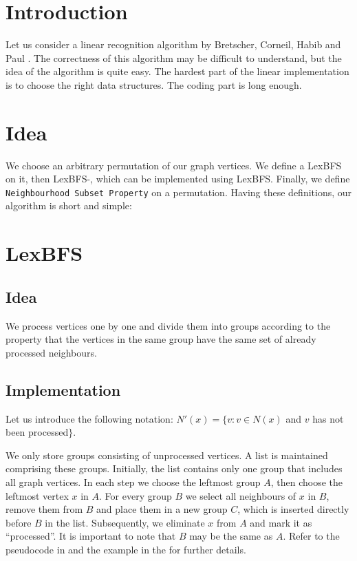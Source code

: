 \section{Introduction}
Let us consider a linear recognition algorithm by Bretscher, Corneil, Habib and
Paul \cite{Bretscher2003ASL}.
The correctness of this algorithm may be difficult to understand, but the idea of the algorithm is quite easy. The hardest part of the linear implementation is to choose the right data structures. The coding part is long enough.
\section{Idea}
We choose an arbitrary permutation of our graph vertices. We define a LexBFS on it, then LexBFS-, which can be implemented using LexBFS. Finally, we define \texttt{Neighbourhood Subset Property} on a permutation. Having these definitions, our algorithm is short and simple:

\section{LexBFS}
\subsection{Idea}
We process vertices one by one and divide them into groups according to the property that the vertices in the same group have the same set of already processed neighbours. 
\subsection{Implementation}
Let us introduce the following notation: $N'(x) = \{v \colon v \in N(x)$ and $v$ has not been processed$\}$.

We only store groups consisting of unprocessed vertices. A list is maintained comprising these groups. Initially, the list contains only one group that includes all graph vertices. In each step we choose the leftmost group $A$, then choose the leftmost vertex $x$ in $A$. For every group $B$ we select all neighbours of $x$ in $B$, remove them from $B$ and place them in a new group $C$, which is inserted directly before $B$ in the list. Subsequently, we eliminate $x$ from $A$ and mark it as ``processed''. It is important to note that $B$ may be the same as $A$. Refer to the pseudocode in  and the example in the  for further details.

